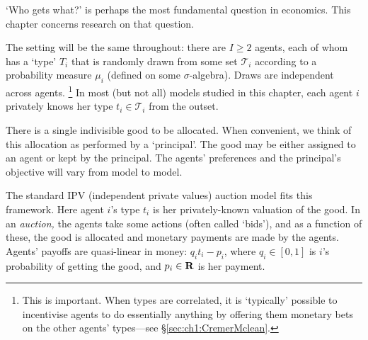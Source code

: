 






`Who gets what?' is perhaps the most fundamental question in economics.
This chapter concerns research on that question.

The setting will be the same throughout: there are $I \geq 2$ agents, each of whom has a `type' $T_i$ that is randomly drawn from some set $\mathcal{T}_i$
according to a probability measure $\mu_i$
(defined on some $\sigma$-algebra).
Draws are independent across agents.%
	\footnote{This is important. When types are correlated, it is `typically' possible to incentivise agents to do essentially anything by offering them monetary bets on the other agents' types---see §\ref{sec:ch1:CremerMclean}.}
In most (but not all) models studied in this chapter, each agent $i$ privately knows her type $t_i \in \mathcal{T}_i$ from the outset.

There is a single indivisible good to be allocated.
When convenient, we think of this allocation as performed by a `principal'.
The good may be either assigned to an agent or kept by the principal.
The agents' preferences and the principal's objective will vary from model to model.

The standard IPV (independent private values) auction model fits this framework.
Here agent $i$'s type $t_i$ is her privately-known valuation of the good.
In an \emph{auction,} the agents take some actions (often called `bids'),
and as a function of these, the good is allocated and monetary payments are made by the agents.
Agents' payoffs are quasi-linear in money: $q_i t_i - p_i$, where $q_i \in [0,1]$ is $i$'s probability of getting the good, and $p_i \in \mathbf{R}$ is her payment.


